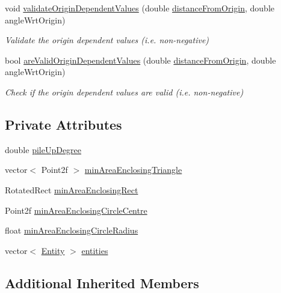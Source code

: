 \begin{DoxyCompactItemize}
void \hyperlink{classmultiscale_1_1analysis_1_1Cluster_a26b9c11e63bfdbfc837a35f68c5c40dd}{validate\-Origin\-Dependent\-Values} (double \hyperlink{classmultiscale_1_1analysis_1_1SpatialCollection2D_ac2a5d3f8c2cb878c710d821c536b8a4f}{distance\-From\-Origin}, double angle\-Wrt\-Origin)
\begin{DoxyCompactList}\small\item\em Validate the origin dependent values (i.\-e. non-\/negative) \end{DoxyCompactList}\item 
bool \hyperlink{classmultiscale_1_1analysis_1_1Cluster_a05e8593354fabd5c1ca18b6a2b19096e}{are\-Valid\-Origin\-Dependent\-Values} (double \hyperlink{classmultiscale_1_1analysis_1_1SpatialCollection2D_ac2a5d3f8c2cb878c710d821c536b8a4f}{distance\-From\-Origin}, double angle\-Wrt\-Origin)
\begin{DoxyCompactList}\small\item\em Check if the origin dependent values are valid (i.\-e. non-\/negative) \end{DoxyCompactList}\end{DoxyCompactItemize}
\subsection*{Private Attributes}
\begin{DoxyCompactItemize}
\item 
double \hyperlink{classmultiscale_1_1analysis_1_1Cluster_ab7e6a3501bc6e94c19b448f502d6ecec}{pile\-Up\-Degree}
\item 
vector$<$ Point2f $>$ \hyperlink{classmultiscale_1_1analysis_1_1Cluster_a7678d48581202c3ecc3f1283a1730dfa}{min\-Area\-Enclosing\-Triangle}
\item 
Rotated\-Rect \hyperlink{classmultiscale_1_1analysis_1_1Cluster_aeb032303a79c6bd43385fcaad9c50742}{min\-Area\-Enclosing\-Rect}
\item 
Point2f \hyperlink{classmultiscale_1_1analysis_1_1Cluster_a47e672060b4025dcd07ebb9c5fd99f0c}{min\-Area\-Enclosing\-Circle\-Centre}
\item 
float \hyperlink{classmultiscale_1_1analysis_1_1Cluster_a070994481884a4c7f5aa4879ce7b0568}{min\-Area\-Enclosing\-Circle\-Radius}
\item 
vector$<$ \hyperlink{classmultiscale_1_1analysis_1_1Entity}{Entity} $>$ \hyperlink{classmultiscale_1_1analysis_1_1Cluster_a820298479651328fb79d92a65f7923d6}{entities}
\end{DoxyCompactItemize}
\subsection*{Additional Inherited Members}



